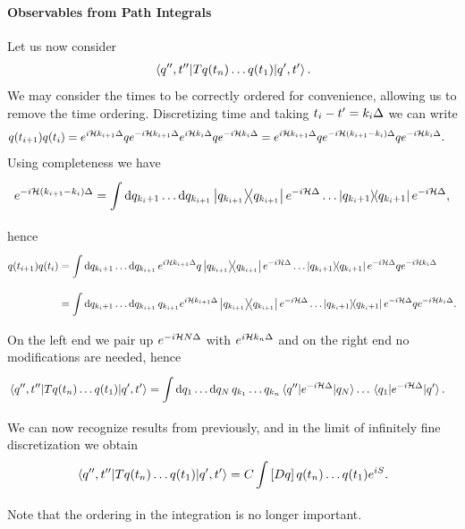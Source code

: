 \paragraph{Observables from Path Integrals}
Let us now consider
\begin{align*}
	\mel{q^{\prime\prime}, t^{\prime\prime}}{\ensuremath{T}q(t_{n})\dots q(t_{1})}{q\ensuremath{^{\prime}}, t\ensuremath{^{\prime}}}.
\end{align*}
We may consider the times to be correctly ordered for convenience, allowing us to remove the time ordering. Discretizing time and taking $t_{i} - t^{\prime} = k_{i}\Delta$ we can write
\begin{align*}
	q(t_{i + 1})q(t_{i}) &= e^{i\mathcal{H} k_{i + 1}\Delta}qe^{-i\mathcal{H} k_{i + 1}\Delta}e^{i\mathcal{H} k_{i}\Delta}qe^{-i\mathcal{H} k_{i}\Delta} = e^{i\mathcal{H} k_{i + 1}\Delta}qe^{-i\mathcal{H} (k_{i + 1} - k_{i})\Delta}qe^{-i\mathcal{H} k_{i}\Delta}.
\end{align*}
Using completeness we have
\begin{align*}
	e^{-i\mathcal{H} (k_{i + 1} - k_{i})\Delta} = \int\limits_{}^{}\dd{q_{k_{i } + 1}}\dots\dd{q_{k_{i + 1}}}\op{q_{k_{i + 1}}}e^{-i\mathcal{H} \Delta}\dots\op{q_{k_{i} + 1}}e^{-i\mathcal{H} \Delta},
\end{align*}
hence
\begin{align*}
	q(t_{i + 1})q(t_{i}) &= \int\limits_{}^{}\dd{q_{k_{i } + 1}}\dots\dd{q_{k_{i + 1}}}e^{i\mathcal{H} k_{i + 1}\Delta}q\op{q_{k_{i + 1}}}e^{-i\mathcal{H} \Delta}\dots\op{q_{k_{i} + 1}}e^{-i\mathcal{H} \Delta}qe^{-i\mathcal{H} k_{i}\Delta} \\
	                     &= \int\limits_{}^{}\dd{q_{k_{i } + 1}}\dots\dd{q_{k_{i + 1}}}q_{k_{i + 1}}e^{i\mathcal{H} k_{i + 1}\Delta}\op{q_{k_{i + 1}}}e^{-i\mathcal{H} \Delta}\dots\op{q_{k_{i} + 1}}e^{-i\mathcal{H} \Delta}qe^{-i\mathcal{H} k_{i}\Delta}.
\end{align*}
On the left end we pair up $e^{-i\mathcal{H} N\Delta}$ with $e^{i\mathcal{H} k_{n}\Delta}$ and on the right end no modifications are needed, hence
\begin{align*}
	\mel{q^{\prime\prime}, t^{\prime\prime}}{\ensuremath{T}q(t_{n})\dots q(t_{1})}{q\ensuremath{^{\prime}}, t\ensuremath{^{\prime}}} &= \int\limits_{}^{}\dd{q_{1}}\dots\dd{q_{N}}q_{k_{1}}\dots q_{k_{n}}\mel{q^{\prime\prime}}{e^{-i\ensuremath{\mathcal{H}}\Delta}}{q_{N}}\dots \mel{q_{1}}{e^{-i\ensuremath{\mathcal{H}}\Delta}}{q\ensuremath{^{\prime}}}.
\end{align*}
We can now recognize results from previously, and in the limit of infinitely fine discretization we obtain
\begin{align*}
	\mel{q^{\prime\prime}, t^{\prime\prime}}{\ensuremath{T}q(t_{n})\dots q(t_{1})}{q\ensuremath{^{\prime}}, t\ensuremath{^{\prime}}} = C\int\limits_{}\left[Dq\right]q(t_{n})\dots q(t_{1})e^{iS}.
\end{align*}
Note that the ordering in the integration is no longer important.

